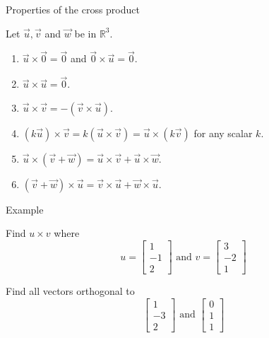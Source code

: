 \documentclass{beamer}
\begin{document}
\begin{frame}{Properties of the cross product}
\begin{theorem}
Let $\vec{u}, \vec{v}$ and $\vec{w}$ be in $\mathbb{R}^3$.
\begin{enumerate}
\item $\vec{u}\times\vec{0}=\vec{0}$ and
$\vec{0}\times\vec{u}=\vec{0}$.
\item $\vec{u}\times\vec{u}=\vec{0}$.
\item $\vec{u}\times\vec{v} = - (\vec{v}\times\vec{u})$.
\item $(k\vec{u})\times\vec{v}
= k(\vec{u}\times\vec{v})
=\vec{u}\times(k\vec{v})$ for any scalar $k$.
\item $\vec{u}\times(\vec{v} + \vec{w}) =
\vec{u}\times\vec{v} + \vec{u}\times\vec{w}$.
\item $(\vec{v} + \vec{w})\times\vec{u}=
\vec{v}\times\vec{u} + \vec{w}\times\vec{u}$.
\end{enumerate}
\end{theorem}
\end{frame}

\begin{frame}{Example}
\begin{example}
  Find $u\times v$ where
  \begin{equation*}
  u= \left[
  \begin{array}{c}
  1\\
  -1\\
  2
  \end{array}
  \right]\text{ and } v = \left[
  \begin{array}{c}
  3\\
  -2\\
  1
  \end{array}
  \right]
  \end{equation*}
\end{example}
\begin{example}
Find all vectors orthogonal to 
\begin{equation*}
\left[
\begin{array}{c}
1\\
-3\\
2
\end{array}
\right]\text{ and } \left[
\begin{array}{c}
0\\
1\\
1
\end{array}
\right]
\end{equation*}
\end{example}
\end{frame}
\end{document}
